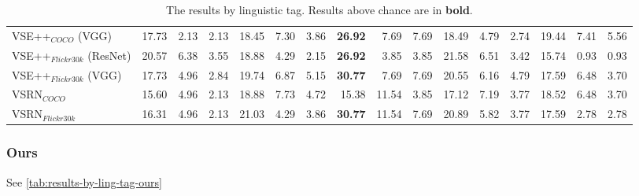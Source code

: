 \begin{table}[ht]
\begin{adjustbox}{max width=\textwidth}
\begin{tabular}{l|rrr|rrr|rrr|rrr|rrr}
 VSE++$_{COCO}$ (VGG)         & 17.73          & 2.13           & 2.13           & 18.45          & 7.30           & 3.86           & \textbf{26.92} & 7.69           & 7.69           & 18.49          & 4.79           & 2.74           & 19.44          & 7.41           & 5.56           \\
 VSE++$_{Flickr30k}$ (ResNet) & 20.57          & 6.38           & 3.55           & 18.88          & 4.29           & 2.15           & \textbf{26.92} & 3.85           & 3.85           & 21.58          & 6.51           & 3.42           & 15.74          & 0.93           & 0.93           \\
 VSE++$_{Flickr30k}$ (VGG)    & 17.73          & 4.96           & 2.84           & 19.74          & 6.87           & 5.15           & \textbf{30.77} & 7.69           & 7.69           & 20.55          & 6.16           & 4.79           & 17.59          & 6.48           & 3.70           \\
 VSRN$_{COCO}$                & 15.60          & 4.96           & 2.13           & 18.88          & 7.73           & 4.72           & 15.38          & 11.54          & 3.85           & 17.12          & 7.19           & 3.77           & 18.52          & 6.48           & 3.70           \\
 VSRN$_{Flickr30k}$           & 16.31          & 4.96           & 2.13           & 21.03          & 4.29           & 3.86           & \textbf{30.77} & 11.54          & 7.69           & 20.89          & 5.82           & 3.77           & 17.59          & 2.78           & 2.78           \\
          \bottomrule
  \end{tabular}
  \end{adjustbox}
  \caption{The results by linguistic tag. Results above chance are in \textbf{bold}.}
    \label{tab:results-by-ling-tag-baseline}
\end{table}

\subsubsection{Ours}

See \cref{tab:results-by-ling-tag-ours}

